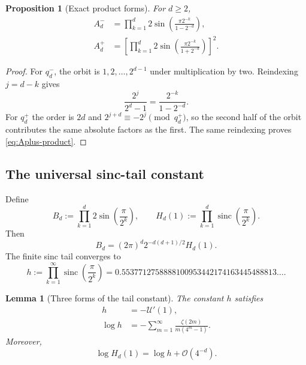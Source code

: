 \documentclass[11pt,oneside]{article}
\newtheorem{proposition}[theorem]{Proposition}
\newtheorem{lemma}[theorem]{Lemma}
\theoremstyle{definition}
\theoremstyle{remark}
\newcommand{\sinc}{\operatorname{sinc}}
\newcommand{\bigO}{\mathcal O}
\begin{document}
\begin{proposition}[Exact product forms]\label{prop:pm-products}
For $d\ge2$,
\begin{align}
 A_d^-&=\prod_{k=1}^{d}
 2\sin\!\left(\frac{\pi2^{-k}}{1-2^{-d}}\right),
 \label{eq:Aminus-product}\\
 A_d^+&=\left[
 \prod_{k=1}^{d}
 2\sin\!\left(\frac{\pi2^{-k}}{1+2^{-d}}\right)
 \right]^2.
 \label{eq:Aplus-product}
\end{align}
\end{proposition}

\begin{proof}
For $q_d^-$, the orbit is $1,2,\ldots,2^{d-1}$ under multiplication by two.
Reindexing $j=d-k$ gives
\[
 \frac{2^j}{2^d-1}=\frac{2^{-k}}{1-2^{-d}}.
\]
For $q_d^+$ the order is $2d$ and $2^{j+d}\equiv-2^j\pmod{q_d^+}$, so the
second half of the orbit contributes the same absolute factors as the first.
The same reindexing proves \eqref{eq:Aplus-product}.
\end{proof}

\subsection{The universal sinc-tail constant}

Define
\begin{equation}
 B_d:=\prod_{k=1}^{d}2\sin\!\left(\frac{\pi}{2^k}\right),
 \qquad
 H_d(1):=\prod_{k=1}^{d}\sinc\!\left(\frac{\pi}{2^k}\right).
 \label{eq:B-Hd}
\end{equation}
Then
\begin{equation}
 B_d=(2\pi)^d2^{-d(d+1)/2}H_d(1).
 \label{eq:B-factor}
\end{equation}
The finite sinc tail converges to
\begin{equation}
 h:=\prod_{k=1}^{\infty}\sinc\!\left(\frac{\pi}{2^k}\right)
 =0.5537712758888100953442174163445488813\ldots.
 \label{eq:h-def}
\end{equation}

\begin{lemma}[Three forms of the tail constant]\label{lem:h-forms}
The constant $h$ satisfies
\begin{align}
 h&=-\mathscr U'(1),
 \label{eq:h-derivative}\\
 \log h&=-\sum_{m=1}^{\infty}
 \frac{\zeta(2m)}{m(4^m-1)}.
 \label{eq:h-zeta-series}
\end{align}
Moreover,
\begin{equation}
 \log H_d(1)=\log h+\bigO(4^{-d}).
 \label{eq:Hd-tail}
\end{equation}
\end{lemma}
\end{document}
